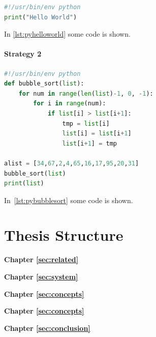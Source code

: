 \begin{lstlisting}[language=Python, caption={This simple helloworld.py file prints Hello World.}, label={lst:pyhelloworld}]
#!/usr/bin/env python
print("Hello World")
\end{lstlisting}
In \autoref{lst:pyhelloworld} some code is shown.

\paragraph{Strategy 2}
\Blindtext[1][1]

\begin{lstlisting}[language=Python, caption={This is a bubble sort function.}, label={lst:pybubblesort}]
#!/usr/bin/env python
def bubble_sort(list):
    for num in range(len(list)-1, 0, -1):
        for i in range(num):
            if list[i] > list[i+1]:
                tmp = list[i]
                list[i] = list[i+1]
                list[i+1] = tmp

alist = [34,67,2,4,65,16,17,95,20,31]
bubble_sort(list)
print(list)
\end{lstlisting}
In~\ref{lst:pybubblesort} some code is shown.

\section{Thesis Structure}
\label{sec:intro:structure}

\textbf{Chapter \ref{sec:related}} \\[0.2em]
\blindtext

\textbf{Chapter \ref{sec:system}} \\[0.2em]
\blindtext

\textbf{Chapter \ref{sec:concepts}} \\[0.2em]
\blindtext

\textbf{Chapter \ref{sec:concepts}} \\[0.2em]
\blindtext

\textbf{Chapter \ref{sec:conclusion}} \\[0.2em]
\blindtext
